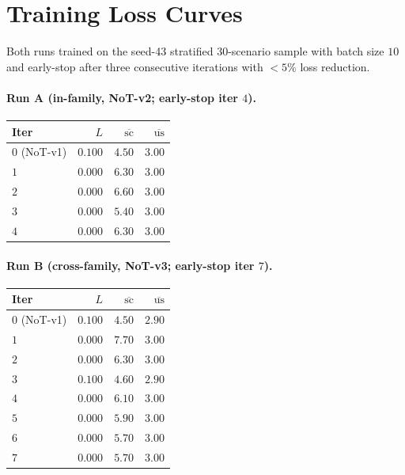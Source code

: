 \documentclass[11pt]{article}
\begin{document}
\section{Training Loss Curves}
\label{app:curves}

Both runs trained on the seed-43 stratified $30$-scenario sample with batch size $10$ and early-stop after three consecutive iterations with $< 5\%$ loss reduction.

\paragraph{Run A (in-family, NoT-v2; early-stop iter $4$).}
\begin{center}\small
\begin{tabular}{lrrr}
\toprule
Iter & $L$ & $\overline{\text{sc}}$ & $\overline{\text{us}}$ \\
\midrule
$0$ (NoT-v1) & $0.100$ & $4.50$ & $3.00$ \\
$1$          & $0.000$ & $6.30$ & $3.00$ \\
$2$          & $0.000$ & $6.60$ & $3.00$ \\
$3$          & $0.000$ & $5.40$ & $3.00$ \\
$4$          & $0.000$ & $6.30$ & $3.00$ \\
\bottomrule
\end{tabular}
\end{center}

\paragraph{Run B (cross-family, NoT-v3; early-stop iter $7$).}
\begin{center}\small
\begin{tabular}{lrrr}
\toprule
Iter & $L$ & $\overline{\text{sc}}$ & $\overline{\text{us}}$ \\
\midrule
$0$ (NoT-v1) & $0.100$ & $4.50$ & $2.90$ \\
$1$          & $0.000$ & $7.70$ & $3.00$ \\
$2$          & $0.000$ & $6.30$ & $3.00$ \\
$3$          & $0.100$ & $4.60$ & $2.90$ \\
$4$          & $0.000$ & $6.10$ & $3.00$ \\
$5$          & $0.000$ & $5.90$ & $3.00$ \\
$6$          & $0.000$ & $5.70$ & $3.00$ \\
$7$          & $0.000$ & $5.70$ & $3.00$ \\
\bottomrule
\end{tabular}
\end{center}
\end{document}
